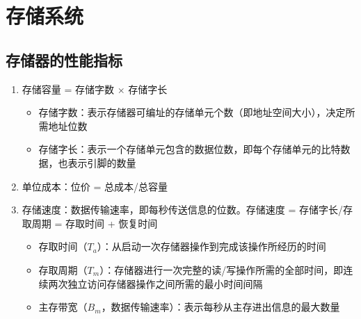 \documentclass[a4paper,12pt]{article}
\begin{document}
    \section{存储系统}

    \subsection{存储器的性能指标}

    \begin{enumerate}
        \item 存储容量 = 存储字数 $\times$ 存储字长
        \begin{itemize}
            \item 存储字数：表示存储器可编址的存储单元个数（即地址空间大小），决定所需地址位数
            \item 存储字长：表示一个存储单元包含的数据位数，即每个存储单元的比特数据，也表示{\color{red}{数据}}引脚的数量
        \end{itemize}
        \item 单位成本：位价 = 总成本/总容量
        \item 存储速度：数据传输速率，即每秒传送信息的位数。存储速度 = 存储字长/存取周期 = 存取时间 + 恢复时间
        \begin{itemize}
            \item 存取时间（$T_a$）：从启动一次存储器操作到完成该操作所经历的时间
            \item 存取周期（$T_m$）：存储器进行一次完整的读/写操作所需的全部时间，即连续两次独立访问存储器操作之间所需的最小时间间隔
            \item 主存带宽（$B_m$，数据传输速率）：表示每秒从主存进出信息的最大数量
        \end{itemize}
    \end{enumerate}
\end{document}

